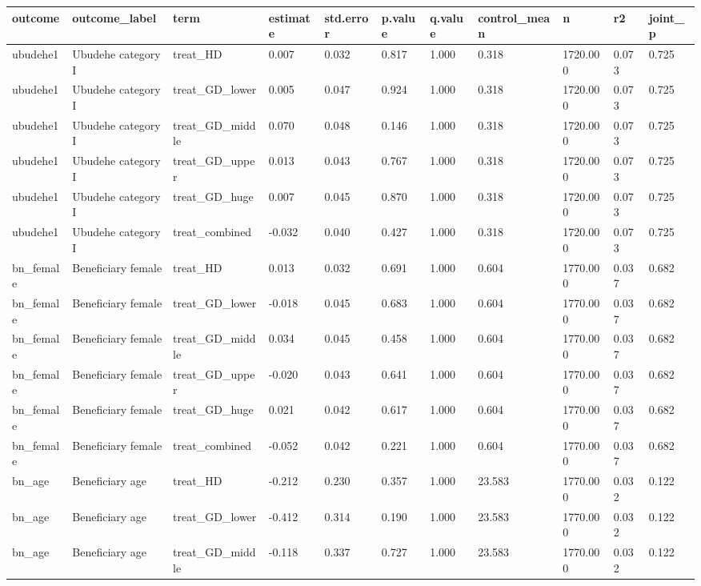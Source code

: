 \begin{tabular}{lllllllllll}
\toprule
outcome & outcome\_label & term & estimate & std.error & p.value & q.value & control\_mean & n & r2 & joint\_p
 \\
\midrule
ubudehe1 & Ubudehe category I & treat\_HD & 0.007 & 0.032 & 0.817 & 1.000 & 0.318 & 1720.000 & 0.073 & 0.725 \\
ubudehe1 & Ubudehe category I & treat\_GD\_lower & 0.005 & 0.047 & 0.924 & 1.000 & 0.318 & 1720.000 & 0.073 & 0.725 \\
ubudehe1 & Ubudehe category I & treat\_GD\_middle & 0.070 & 0.048 & 0.146 & 1.000 & 0.318 & 1720.000 & 0.073 & 0.725 \\
ubudehe1 & Ubudehe category I & treat\_GD\_upper & 0.013 & 0.043 & 0.767 & 1.000 & 0.318 & 1720.000 & 0.073 & 0.725 \\
ubudehe1 & Ubudehe category I & treat\_GD\_huge & 0.007 & 0.045 & 0.870 & 1.000 & 0.318 & 1720.000 & 0.073 & 0.725 \\
ubudehe1 & Ubudehe category I & treat\_combined & -0.032 & 0.040 & 0.427 & 1.000 & 0.318 & 1720.000 & 0.073 & 0.725 \\
bn\_female & Beneficiary female & treat\_HD & 0.013 & 0.032 & 0.691 & 1.000 & 0.604 & 1770.000 & 0.037 & 0.682 \\
bn\_female & Beneficiary female & treat\_GD\_lower & -0.018 & 0.045 & 0.683 & 1.000 & 0.604 & 1770.000 & 0.037 & 0.682 \\
bn\_female & Beneficiary female & treat\_GD\_middle & 0.034 & 0.045 & 0.458 & 1.000 & 0.604 & 1770.000 & 0.037 & 0.682 \\
bn\_female & Beneficiary female & treat\_GD\_upper & -0.020 & 0.043 & 0.641 & 1.000 & 0.604 & 1770.000 & 0.037 & 0.682 \\
bn\_female & Beneficiary female & treat\_GD\_huge & 0.021 & 0.042 & 0.617 & 1.000 & 0.604 & 1770.000 & 0.037 & 0.682 \\
bn\_female & Beneficiary female & treat\_combined & -0.052 & 0.042 & 0.221 & 1.000 & 0.604 & 1770.000 & 0.037 & 0.682 \\
bn\_age & Beneficiary age & treat\_HD & -0.212 & 0.230 & 0.357 & 1.000 & 23.583 & 1770.000 & 0.032 & 0.122 \\
bn\_age & Beneficiary age & treat\_GD\_lower & -0.412 & 0.314 & 0.190 & 1.000 & 23.583 & 1770.000 & 0.032 & 0.122 \\
bn\_age & Beneficiary age & treat\_GD\_middle & -0.118 & 0.337 & 0.727 & 1.000 & 23.583 & 1770.000 & 0.032 & 0.122 \\

\end{tabular}
